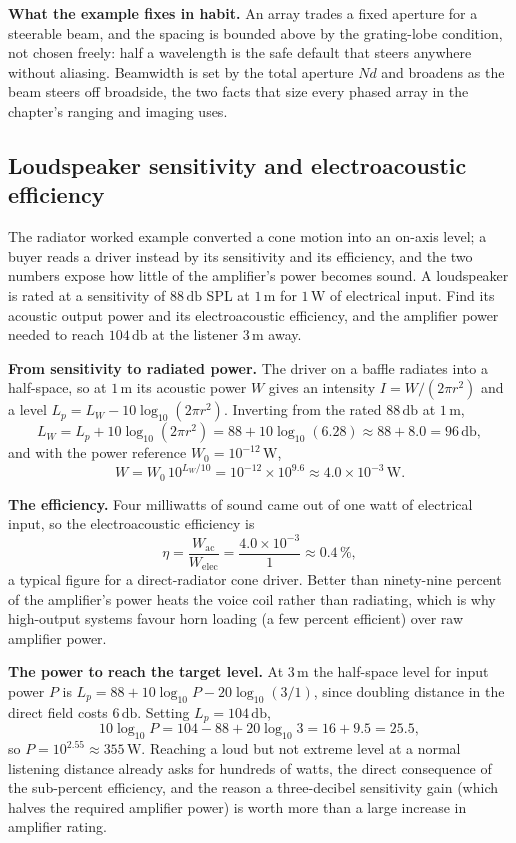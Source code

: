 \textbf{What the example fixes in habit.} An array trades a fixed aperture
for a steerable beam, and the spacing is bounded above by the grating-lobe
condition, not chosen freely: half a wavelength is the safe default that
steers anywhere without aliasing. Beamwidth is set by the total aperture
$Nd$ and broadens as the beam steers off broadside, the two facts that size
every phased array in the chapter's ranging and imaging uses.

\subsection{Loudspeaker sensitivity and electroacoustic efficiency}

The radiator worked example converted a cone motion into an on-axis level;
a buyer reads a driver instead by its sensitivity and its efficiency, and
the two numbers expose how little of the amplifier's power becomes sound.
A loudspeaker is rated at a sensitivity of $88\,\si{\decibel}$ SPL at
$1\,\si{\meter}$ for $1\,\si{\watt}$ of electrical input. Find its acoustic
output power and its electroacoustic efficiency, and the amplifier power
needed to reach $104\,\si{\decibel}$ at the listener $3\,\si{\meter}$ away.

\textbf{From sensitivity to radiated power.} The driver on a baffle
radiates into a half-space, so at $1\,\si{\meter}$ its acoustic power $W$
gives an intensity $I = W/(2\pi r^2)$ and a level $L_p = L_W - 10\log_{10}
(2\pi r^2)$. Inverting from the rated $88\,\si{\decibel}$ at $1\,\si{\meter}$,
\[
L_W = L_p + 10\log_{10}(2\pi r^2) = 88 + 10\log_{10}(6.28) \approx
      88 + 8.0 = 96\,\si{\decibel},
\]
and with the power reference $W_0 = 10^{-12}\,\si{\watt}$,
\[
W = W_0\,10^{L_W/10} = 10^{-12}\times 10^{9.6}
  \approx 4.0\times 10^{-3}\,\si{\watt}.
\]

\textbf{The efficiency.} Four milliwatts of sound came out of one watt of
electrical input, so the electroacoustic efficiency is
\[
\eta = \frac{W_{\text{ac}}}{W_{\text{elec}}}
     = \frac{4.0\times 10^{-3}}{1}
     \approx 0.4\,\%,
\]
a typical figure for a direct-radiator cone driver. Better than
ninety-nine percent of the amplifier's power heats the voice coil rather
than radiating, which is why high-output systems favour horn loading (a few
percent efficient) over raw amplifier power.

\textbf{The power to reach the target level.} At $3\,\si{\meter}$ the
half-space level for input power $P$ is $L_p = 88 + 10\log_{10}P -
20\log_{10}(3/1)$, since doubling distance in the direct field costs
$6\,\si{\decibel}$. Setting $L_p = 104\,\si{\decibel}$,
\[
10\log_{10}P = 104 - 88 + 20\log_{10}3 = 16 + 9.5 = 25.5,
\]
so $P = 10^{2.55}\approx 355\,\si{\watt}$. Reaching a loud but not extreme
level at a normal listening distance already asks for hundreds of watts,
the direct consequence of the sub-percent efficiency, and the reason a
three-decibel sensitivity gain (which halves the required amplifier power)
is worth more than a large increase in amplifier rating.

